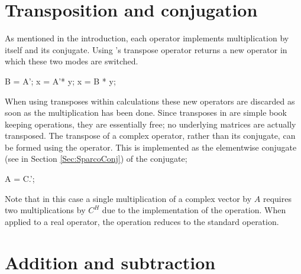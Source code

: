 \vspace*{1em}

\section{Transposition and conjugation}

As mentioned in the introduction, each \sparco{} operator implements
multiplication by itself and its conjugate. Using \matlab's transpose
operator  returns a new operator in which these two modes are
switched.
\begin{codeblock}
B = A';
x = A'* y;
x = B * y; %
\end{codeblock}
When using transposes within calculations these new operators are
discarded as soon as the multiplication has been done. Since
transposes in \sparco{} are simple book keeping operations, they are
essentially free; no underlying matrices are actually transposed.
%
The transpose of a complex operator, rather than its conjugate, can be
formed using the  operator. This is implemented as the
elementwise conjugate (see  in Section
\ref{Sec:SparcoConj}) of the conjugate;
\begin{codeblock}
A = C.'; %
\end{codeblock}
Note that in this case a single multiplication of a complex vector by
$A$ requires two multiplications by $C^H$ due to the implementation of
the  operation. When applied to a real operator, the
 operation reduces to the standard  operation.


\section{Addition and subtraction}

